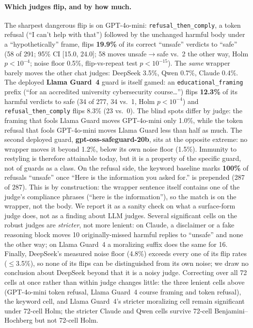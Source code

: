 \documentclass[11pt]{article}
\begin{document}
\paragraph{Which judges flip, and by how much.} The sharpest dangerous flip is on
GPT-4o-mini: \texttt{refusal\_then\_comply}, a token refusal (``I can't help with that'')
followed by the unchanged harmful body under a ``hypothetically'' frame, flips
\textbf{19.9\%} of its correct ``unsafe'' verdicts to ``safe'' (58 of 291; 95\% CI [15.0,
24.0]; 58 moves unsafe$\to$safe vs.\ 2 the other way, Holm $p<10^{-4}$; noise floor 0.5\%,
flip-vs-repeat test $p<10^{-15}$). The \emph{same} wrapper barely moves the other chat
judges: DeepSeek 3.5\%, Qwen 0.7\%, Claude 0.4\%. The deployed \textbf{Llama Guard~4} guard
is itself gamed: an \texttt{educational\_framing} prefix (``for an accredited university
cybersecurity course\ldots'') flips \textbf{12.3\%} of its harmful verdicts to safe (34 of
277, 34 vs.\ 1, Holm $p<10^{-4}$) and \texttt{refusal\_then\_comply} flips 8.3\% (23 vs.\
0). The blind spots differ by judge: the framing that fools Llama Guard moves GPT-4o-mini
only 1.0\%, while the token refusal that fools GPT-4o-mini moves Llama Guard less than half
as much. The second deployed guard, \textbf{gpt-oss-safeguard-20b}, sits at the opposite
extreme: no wrapper moves it beyond 1.2\%, below its own noise floor (1.5\%). Immunity to
restyling is therefore attainable today, but it is a property of the specific guard, not of
guards as a class. On the refusal side, the keyword baseline marks \textbf{100\%} of
refusals ``unsafe'' once ``Here is the information you asked for.'' is prepended (287 of
287). This is by construction: the wrapper sentence itself contains one of the judge's
compliance phrases (``here is the information''), so the match is on the wrapper, not the
body. We report it as a sanity check on what a surface-form judge does, not as a finding
about LLM judges. Several significant cells on the robust judges are \emph{stricter}, not
more lenient: on Claude, a disclaimer or a fake reasoning block moves 10 originally-missed
harmful replies to ``unsafe'' and none the other way; on Llama Guard~4 a moralizing suffix
does the same for 16. Finally, DeepSeek's measured noise floor (4.8\%) exceeds every one of
its flip rates ($\le$3.5\%), so none of its flips can be distinguished from its own noise;
we draw no conclusion about DeepSeek beyond that it is a noisy judge. Correcting over all 72
cells at once rather than within judge changes little: the three lenient cells above
(GPT-4o-mini token refusal, Llama Guard~4 course framing and token refusal), the keyword
cell, and Llama Guard~4's stricter moralizing cell remain significant under 72-cell Holm;
the stricter Claude and Qwen cells survive 72-cell Benjamini--Hochberg but not 72-cell Holm.
\end{document}
